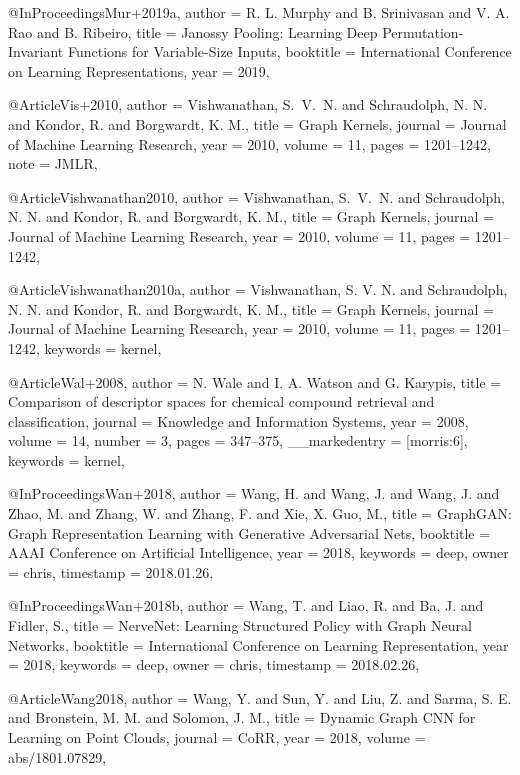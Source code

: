 @InProceedings{Mur+2019a,
  author    = {R. L. Murphy and B. Srinivasan and V. A. Rao and B. Ribeiro},
  title     = {Janossy Pooling: Learning Deep Permutation-Invariant Functions for Variable-Size Inputs},
  booktitle = {International Conference on Learning Representations},
  year      = {2019},
}

@Article{Vis+2010,
  author  = {Vishwanathan, S.~V.~N. and Schraudolph, N. N. and Kondor, R. and Borgwardt, K. M.},
  title   = {Graph Kernels},
  journal = {Journal of Machine Learning Research},
  year    = {2010},
  volume  = {11},
  pages   = {1201--1242},
  note    = {JMLR},
}

@Article{Vishwanathan2010,
  author  = {Vishwanathan, S.~V.~N. and Schraudolph, N. N. and Kondor, R. and Borgwardt, K. M.},
  title   = {Graph Kernels},
  journal = {Journal of Machine Learning Research},
  year    = {2010},
  volume  = {11},
  pages   = {1201--1242},
}

@Article{Vishwanathan2010a,
  author   = {Vishwanathan, S. V. N. and Schraudolph, N. N. and Kondor, R. and Borgwardt, K. M.},
  title    = {Graph Kernels},
  journal  = {Journal of Machine Learning Research},
  year     = {2010},
  volume   = {11},
  pages    = {1201--1242},
  keywords = {kernel},
}

@Article{Wal+2008,
  author        = {N. Wale and I. A. Watson and G. Karypis},
  title         = {Comparison of descriptor spaces for chemical compound retrieval and classification},
  journal       = {Knowledge and Information Systems},
  year          = {2008},
  volume        = {14},
  number        = {3},
  pages         = {347--375},
  __markedentry = {[morris:6]},
  keywords      = {kernel},
}

@InProceedings{Wan+2018,
  author    = {Wang, H. and Wang, J. and Wang, J. and Zhao, M. and Zhang, W. and Zhang, F. and Xie, X. Guo, M.},
  title     = {GraphGAN: Graph Representation Learning with Generative Adversarial Nets},
  booktitle = {AAAI Conference on Artificial Intelligence},
  year      = {2018},
  keywords  = {deep},
  owner     = {chris},
  timestamp = {2018.01.26},
}

@InProceedings{Wan+2018b,
  author    = {Wang, T. and Liao, R. and Ba, J. and Fidler, S.},
  title     = {NerveNet: Learning Structured Policy with Graph Neural Networks},
  booktitle = {International Conference on Learning Representation},
  year      = {2018},
  keywords  = {deep},
  owner     = {chris},
  timestamp = {2018.02.26},
}

@Article{Wang2018,
  author  = {Wang, Y. and Sun, Y. and Liu, Z. and Sarma, S. E. and Bronstein, M. M. and Solomon, J. M.},
  title   = {Dynamic Graph {{CNN}} for Learning on Point Clouds},
  journal = {CoRR},
  year    = {2018},
  volume  = {abs/1801.07829},
}

